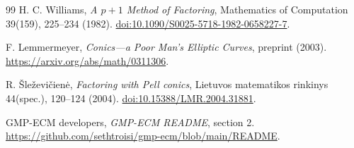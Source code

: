 \documentclass[11pt]{article}
\theoremstyle{definition}\newtheorem{definition}[theorem]{Definition}
\begin{document}
\begin{thebibliography}{99}
H. C. Williams, \emph{A $p+1$ Method of Factoring},
Mathematics of Computation 39(159), 225--234 (1982).
\href{https://doi.org/10.1090/S0025-5718-1982-0658227-7}{doi:10.1090/S0025-5718-1982-0658227-7}.

F. Lemmermeyer, \emph{Conics---a Poor Man's Elliptic Curves},
preprint (2003). \url{https://arxiv.org/abs/math/0311306}.

R. \v{S}le\v{z}evi\v{c}ien\.{e}, \emph{Factoring with Pell conics},
Lietuvos matematikos rinkinys 44(spec.), 120--124 (2004).
\href{https://doi.org/10.15388/LMR.2004.31881}{doi:10.15388/LMR.2004.31881}.

GMP-ECM developers, \emph{GMP-ECM README}, section 2.
\url{https://github.com/sethtroisi/gmp-ecm/blob/main/README}.
\end{thebibliography}
\end{document}
